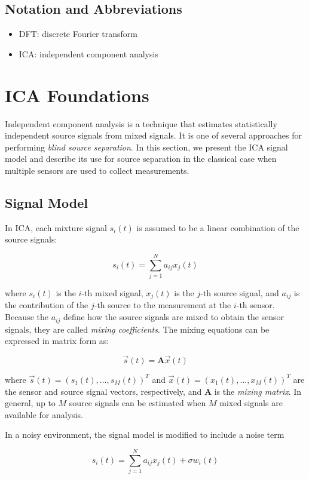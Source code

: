 \documentclass[10pt]{article}
\begin{document}
\subsection*{Notation and Abbreviations}
\begin{itemize}
    \item DFT: discrete Fourier transform
    \item ICA: independent component analysis
\end{itemize}


\section{ICA Foundations}
Independent component analysis is a technique that estimates statistically independent
source signals from mixed signals. It is one of several approaches for performing
\emph{blind source separation}. In this section, we present the ICA signal model and
describe its use for source separation in the classical case when multiple sensors are
used to collect measurements.

\subsection*{Signal Model}
In ICA, each mixture signal $s_i(t)$ is assumed to be a linear combination of the source
signals:

$$
s_i(t) = \sum_{j=1}^N a_{ij} x_j(t)
$$

\noindent where $s_i(t)$ is the $i$-th mixed signal, $x_j(t)$ is the $j$-th source signal,
and $a_{ij}$ is the contribution of the $j$-th source to the measurement at the $i$-th
sensor. Because the $a_{ij}$ define how the source signals are mixed to obtain the sensor
signals, they are called \emph{mixing coefficients}. The mixing equations can be expressed
in matrix form as:

$$
\vec{s}(t) = \mathbf{A} \vec{x}(t)
$$

\noindent where $\vec{s}(t) =  (s_1(t), \ldots, s_M(t))^T$ and
$\vec{x}(t) =  (x_1(t), \ldots, x_M(t))^T$
are the sensor and source signal vectors, respectively, and $\mathbf{A}$ is the
\emph{mixing matrix}. In general, up to $M$ source signals can be estimated when $M$ mixed
signals are available for analysis.

In a noisy environment, the signal model is modified to include a noise term

$$
s_i(t) = \sum_{j=1}^N a_{ij} x_j(t) + \sigma w_i(t)
$$
\end{document}
